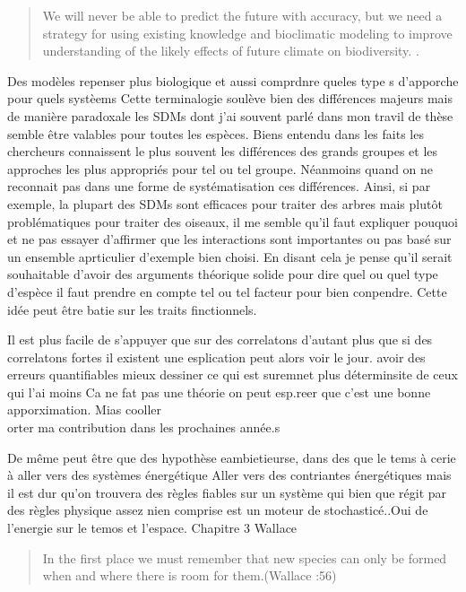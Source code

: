 \begin{quote}
We will never be able to predict the future with accuracy, but we need a
strategy for using existing knowledge and bioclimatic modeling to
improve understanding of the likely effects of future climate on
biodiversity. \citep{Araujo2006}.
\end{quote}

Des modèles repenser plus biologique et aussi comprdnre queles type s
d'apporche pour quels systèems Cette terminalogie soulève bien des
différences majeurs mais de manière paradoxale les SDMs dont j'ai
souvent parlé dans mon travil de thèse semble être valables pour toutes
les espèces. Biens entendu dans les faits les chercheurs connaissent le
plus souvent les différences des grands groupes et les approches les
plus appropriés pour tel ou tel groupe. Néanmoins quand on ne reconnait
pas dans une forme de systématisation ces différences. Ainsi, si par
exemple, la plupart des SDMs sont efficaces pour traiter des arbres mais
plutôt problématiques pour traiter des oiseaux, il me semble qu'il faut
expliquer pouquoi et ne pas essayer d'affirmer que les interactions sont
importantes ou pas basé sur un ensemble aprticulier d'exemple bien
choisi. En disant cela je pense qu'il serait souhaitable d'avoir des
arguments théorique solide pour dire quel ou quel type d'espèce il faut
prendre en compte tel ou tel facteur pour bien conpendre. Cette idée
peut être batie sur les traits finctionnels.

Il est plus facile de s'appuyer que sur des correlatons d'autant plus
que si des correlatons fortes il existent une esplication peut alors
voir le jour. avoir des erreurs quantifiables mieux dessiner ce qui est
suremnet plus déterminsite de ceux qui l'ai moins Ca ne fat pas une
théorie on peut esp.reer que c'est une bonne apporximation. Mias
cooller\\
orter ma contribution dans les prochaines année.s

De même peut être que des hypothèse eambietieurse, dans des que le tems
à cerie à aller vers des systèmes énergétique Aller vers des contriantes
énergétiques mais il est dur qu'on trouvera des règles fiables sur un
système qui bien que régit par des règles physique assez nien comprise
est un moteur de stochasticé..Oui de l'energie sur le temos et l'espace.
Chapitre 3 Wallace

\begin{quote}
In the first place we must remember that new species can only be formed
when and where there is room for them.(Wallace :56)
\end{quote}
